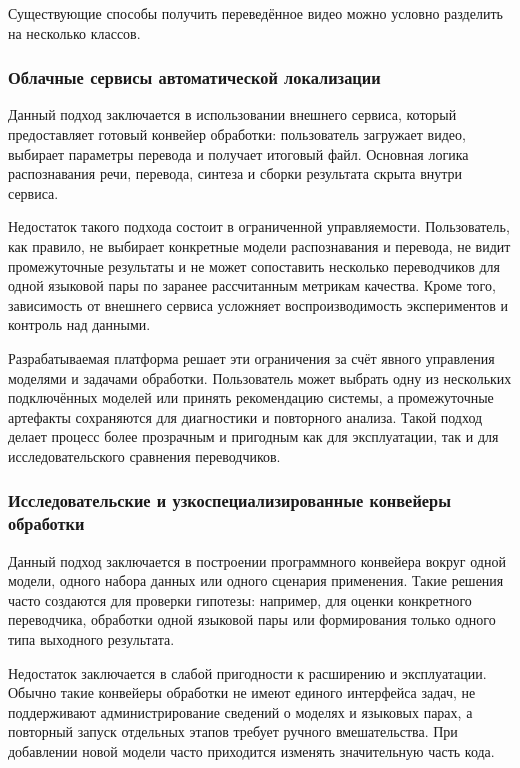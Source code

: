 \documentclass[a4paper,article,14pt]{extarticle}
\begin{document}
Существующие способы получить переведённое видео можно условно разделить на несколько классов.

\subsubsection{Облачные сервисы автоматической локализации}

Данный подход заключается в использовании внешнего сервиса, который предоставляет готовый конвейер обработки: пользователь загружает видео, выбирает параметры перевода и получает итоговый файл. Основная логика распознавания речи, перевода, синтеза и сборки результата скрыта внутри сервиса.

Недостаток такого подхода состоит в ограниченной управляемости. Пользователь, как правило, не выбирает конкретные модели распознавания и перевода, не видит промежуточные результаты и не может сопоставить несколько переводчиков для одной языковой пары по заранее рассчитанным метрикам качества. Кроме того, зависимость от внешнего сервиса усложняет воспроизводимость экспериментов и контроль над данными.

Разрабатываемая платформа решает эти ограничения за счёт явного управления моделями и задачами обработки. Пользователь может выбрать одну из нескольких подключённых моделей или принять рекомендацию системы, а промежуточные артефакты сохраняются для диагностики и повторного анализа. Такой подход делает процесс более прозрачным и пригодным как для эксплуатации, так и для исследовательского сравнения переводчиков.

\subsubsection{Исследовательские и узкоспециализированные конвейеры обработки}

Данный подход заключается в построении программного конвейера вокруг одной модели, одного набора данных или одного сценария применения. Такие решения часто создаются для проверки гипотезы: например, для оценки конкретного переводчика, обработки одной языковой пары или формирования только одного типа выходного результата.

Недостаток заключается в слабой пригодности к расширению и эксплуатации. Обычно такие конвейеры обработки не имеют единого интерфейса задач, не поддерживают администрирование сведений о моделях и языковых парах, а повторный запуск отдельных этапов требует ручного вмешательства. При добавлении новой модели часто приходится изменять значительную часть кода.
\end{document}
